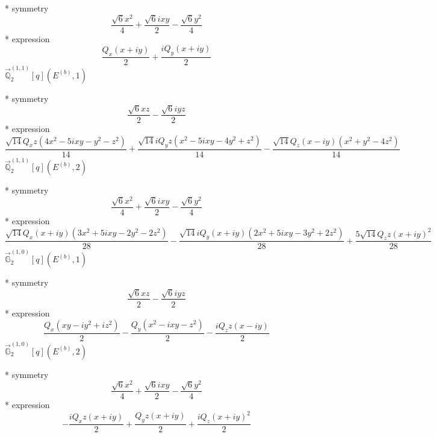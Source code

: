 \documentclass[fleqn,8pt]{jsarticle}
\begin{document}
\noindent\quad ** symmetry
\begin{dmath*}
\frac{\sqrt{6} x^{2}}{4} + \frac{\sqrt{6} i x y}{2} - \frac{\sqrt{6} y^{2}}{4}
\end{dmath*}
\noindent\quad ** expression
\begin{dmath*}
\frac{Q_{x} \left(x + i y\right)}{2} + \frac{i Q_{y} \left(x + i y\right)}{2}
\end{dmath*}
\noindent\quad $\vec{\mathbb{Q}}_{2}^{(1,1)}[q](E^{(b)},1)$

\noindent\quad ** symmetry
\begin{dmath*}
\frac{\sqrt{6} x z}{2} - \frac{\sqrt{6} i y z}{2}
\end{dmath*}
\noindent\quad ** expression
\begin{dmath*}
\frac{\sqrt{14} Q_{x} z \left(4 x^{2} - 5 i x y - y^{2} - z^{2}\right)}{14} + \frac{\sqrt{14} i Q_{y} z \left(x^{2} - 5 i x y - 4 y^{2} + z^{2}\right)}{14} - \frac{\sqrt{14} Q_{z} \left(x - i y\right) \left(x^{2} + y^{2} - 4 z^{2}\right)}{14}
\end{dmath*}
\noindent\quad $\vec{\mathbb{Q}}_{2}^{(1,1)}[q](E^{(b)},2)$

\noindent\quad ** symmetry
\begin{dmath*}
\frac{\sqrt{6} x^{2}}{4} + \frac{\sqrt{6} i x y}{2} - \frac{\sqrt{6} y^{2}}{4}
\end{dmath*}
\noindent\quad ** expression
\begin{dmath*}
\frac{\sqrt{14} Q_{x} \left(x + i y\right) \left(3 x^{2} + 5 i x y - 2 y^{2} - 2 z^{2}\right)}{28} - \frac{\sqrt{14} i Q_{y} \left(x + i y\right) \left(2 x^{2} + 5 i x y - 3 y^{2} + 2 z^{2}\right)}{28} + \frac{5 \sqrt{14} Q_{z} z \left(x + i y\right)^{2}}{28}
\end{dmath*}
\noindent\quad $\vec{\mathbb{G}}_{2}^{(1,0)}[q](E^{(b)},1)$

\noindent\quad ** symmetry
\begin{dmath*}
\frac{\sqrt{6} x z}{2} - \frac{\sqrt{6} i y z}{2}
\end{dmath*}
\noindent\quad ** expression
\begin{dmath*}
\frac{Q_{x} \left(x y - i y^{2} + i z^{2}\right)}{2} - \frac{Q_{y} \left(x^{2} - i x y - z^{2}\right)}{2} - \frac{i Q_{z} z \left(x - i y\right)}{2}
\end{dmath*}
\noindent\quad $\vec{\mathbb{G}}_{2}^{(1,0)}[q](E^{(b)},2)$

\noindent\quad ** symmetry
\begin{dmath*}
\frac{\sqrt{6} x^{2}}{4} + \frac{\sqrt{6} i x y}{2} - \frac{\sqrt{6} y^{2}}{4}
\end{dmath*}
\noindent\quad ** expression
\begin{dmath*}
- \frac{i Q_{x} z \left(x + i y\right)}{2} + \frac{Q_{y} z \left(x + i y\right)}{2} + \frac{i Q_{z} \left(x + i y\right)^{2}}{2}
\end{dmath*}
\end{document}
